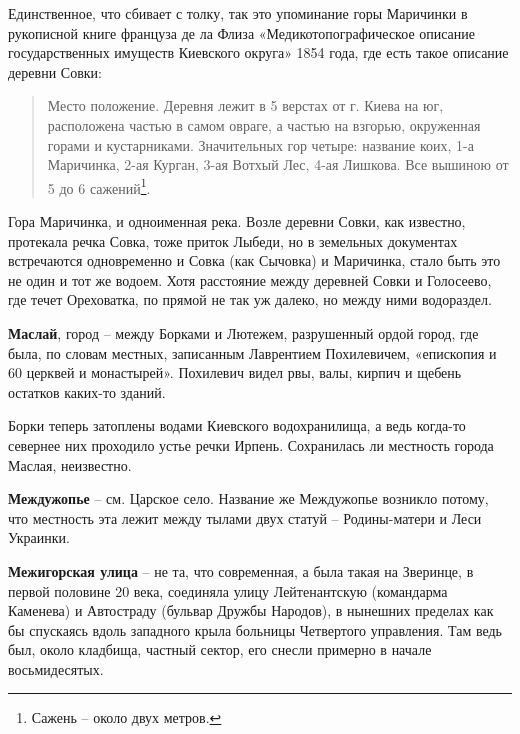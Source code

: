 Единственное, что сбивает с толку, так это упоминание горы Маричинки в рукописной книге француза де ла Флиза «Медикотопографическое описание государственных имуществ Киевского округа» 1854 года, где есть такое описание деревни Совки:

\begin{quotation}
Место положение. Деревня лежит в 5 верстах от г. Киева на юг, расположена частью в самом овраге, а частью на взгорью, окруженная горами и кустарниками. Значительных гор четыре: название коих, 1-а Маричинка, 2-ая Курган, 3-ая Вотхый Лес, 4-ая Лишкова. Все вышиною от 5 до 6 сажений\footnote{Сажень – около двух метров.}.
\end{quotation}

Гора Маричинка, и одноименная река. Возле деревни Совки, как известно, протекала речка Совка, тоже приток Лыбеди, но в земельных документах встречаются одновременно и Совка (как Сычовка) и Маричинка, стало быть это не один и тот же водоем. Хотя расстояние между деревней Совки и Голосеево, где течет Ореховатка, по прямой не так уж далеко, но между ними водораздел.\\ 

\medskip

\textbf{Маслай}, город – между Борками и Лютежем, разрушенный ордой город, где была, по словам местных, записанным Лаврентием Похилевичем, «епископия и 60 церквей и монастырей». Похилевич видел рвы, валы, кирпич и щебень остатков каких-то зданий.

Борки теперь затоплены водами Киевского водохранилища, а ведь когда-то севернее них проходило устье речки Ирпень. Сохранилась ли местность города Маслая, неизвестно.\\

\medskip

\textbf{Междужопье} – см. Царское село. Название же Междужопье возникло потому, что местность эта лежит между тылами двух статуй – Родины-матери и Леси Украинки.\\

\medskip

\textbf{Межигорская улица} – не та, что современная, а была такая на Зверинце, в первой половине 20 века, соединяла улицу Лейтенантскую (командарма Каменева) и Автостраду (бульвар Дружбы Народов), в нынешних пределах как бы спускаясь вдоль западного крыла больницы Четвертого управления. Там ведь был, около кладбища, частный сектор, его снесли примерно в начале восьмидесятых.\\

\medskip

